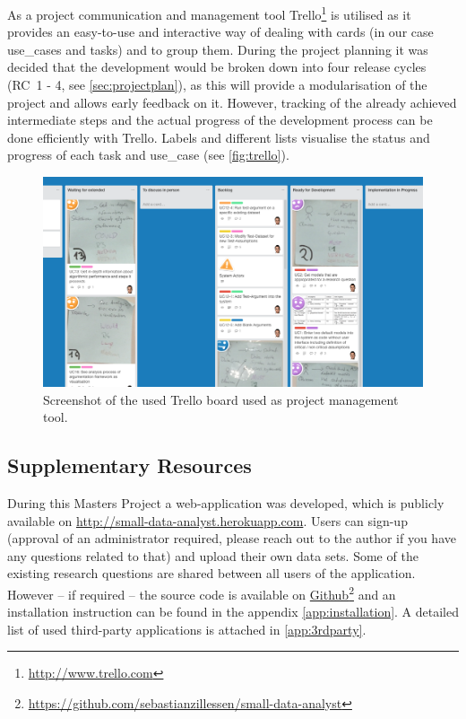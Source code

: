 As a project communication and management tool Trello\footnote{\url{http://www.trello.com}} is utilised as it provides an easy-to-use and interactive way of dealing with cards (in our case \glspl{use_case} and tasks) and to group them. During the project planning it was decided that the development would be broken down into four release cycles (RC~1 - 4, see \autoref{sec:projectplan}), as this will provide a modularisation of the project and allows early feedback on it. However, tracking of the already achieved intermediate steps and the actual progress of the development process can be done efficiently with Trello. Labels and different lists visualise the status and progress of each task and \gls{use_case} (see \autoref{fig:trello}).


\begin{figure}[h]
\centering
	\includegraphics[page=1,width=\textwidth]{figures/trello}
\caption{Screenshot of the used Trello board used as project management tool.}
\label{fig:trello}
\end{figure}

\subsection{Supplementary Resources}

During this Masters Project a web-application was developed, which is publicly available on \href{http://small-data-analyst.herokuapp.com}{http://small-data-analyst.herokuapp.com}. Users can sign-up (approval of an administrator required, please reach out to the author if you have any questions related to that) and upload their own data sets. Some of the existing research questions are shared between all users of the application. However -- if required -- the source code is available on \href{https://github.com/sebastianzillessen/small-data-analyst}{Github}\footnote{\url{https://github.com/sebastianzillessen/small-data-analyst}} and an installation instruction can be found in the appendix \autoref{app:installation}. A detailed list of used third-party applications is attached in \autoref{app:3rdparty}.
